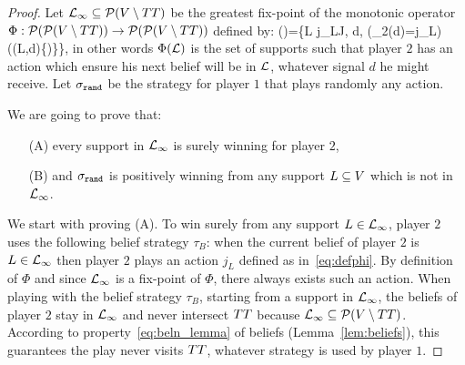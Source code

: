 \begin{proof}


Let $\mathcal{L}_\infty\subseteq \mathcal{P}(V\setminus TT)$
be the greatest fix-point of the monotonic operator
$\Phi:\mathcal{P}(\mathcal{P}(V\setminus TT))\to \mathcal{P}(\mathcal{P}(V\setminus TT))$ defined by:
\be
\label{eq:defphi}
\Phi(\LL)=\{L\in \LL \mid
\exists j_L\in J, \forall d\in\signauxdeux, (\action_2(d)=j_L)\implies (\beldeux(L,d)\in \LL \cup \{\emptyset)\}\}\enspace,
\ee
in other words $\Phi(\mathcal{L})$ is the set of supports
such that player $2$ has an action which
ensure his next belief will be in $\mathcal{L}$,
whatever signal $d$ he might receive.
Let $\sigma_{{\tt rand}}$ be the strategy for player $1$ that plays randomly any action.

We are going to prove that:
\begin{enumerate}
\item[(A)] every support in $\mathcal{L}_\infty$ is surely winning for player $2$,
\item[(B)] and $\sigma_{{\tt rand}}$ is positively winning from any support $L\subseteq V$ which is not in $\mathcal{L}_\infty$.
\end{enumerate}

We start with proving (A).
To win surely from any support $L\in\mathcal{L}_\infty$, player $2$ uses the following
belief strategy $\tau_B$: when the current belief of player $2$ is $L\in\mathcal{L}_\infty$ then player $2$
plays an action $j_L$ defined as in~\eqref{eq:defphi}.
By definition of $\Phi$ and since $\mathcal{L}_\infty$ is a fix-point of $\Phi$,
there always exists such an action.
When playing with the belief strategy $\tau_B$,
starting from a support in $\mathcal{L}_\infty$,
the beliefs of player $2$ stay in $\mathcal{L}_\infty$
and never intersect $TT$ because $\mathcal{L}_\infty\subseteq \mathcal{P}(V\setminus TT)$.
{According to property~\eqref{eq:beln_lemma} of beliefs (Lemma~\ref{lem:beliefs})},
this guarantees the play never visits $TT$,
whatever strategy is used by player $1$.


\end{proof}
